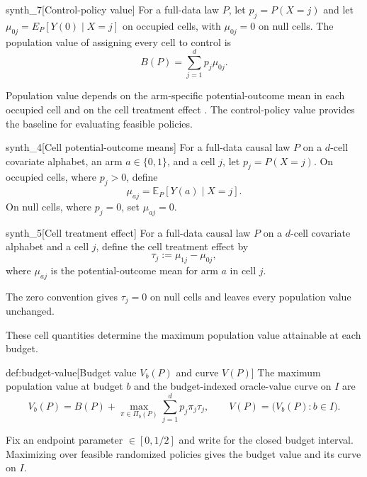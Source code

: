 \begin{definitionv}{synth_7}[Control-policy value]
For a full-data law \(P\), let \(p_j=P(X=j)\) and let \(\mu_{0j}=E_P[Y(0)\mid X=j]\) on occupied cells, with \(\mu_{0j}=0\) on null cells. The population value of assigning every cell to control is
\[
B(P)=\sum_{j=1}^d p_j\mu_{0j}.
\]
\end{definitionv}

Population value depends on the arm-specific potential-outcome mean  in each occupied cell and on the cell treatment effect . The control-policy value  provides the baseline for evaluating feasible policies.

\begin{definitionv}{synth_4}[Cell potential-outcome means]
For a full-data causal law \(P\) on a \(d\)-cell covariate alphabet, an arm \(a\in\{0,1\}\), and a cell \(j\), let \(p_j=P(X=j)\). On occupied cells, where \(p_j>0\), define
\[
\mu_{aj}=\mathbb E_P\!\left[Y(a)\mid X=j\right].
\]
On null cells, where \(p_j=0\), set \(\mu_{aj}=0\).
\end{definitionv}

\begin{definitionv}{synth_5}[Cell treatment effect]
For a full-data causal law \(P\) on a \(d\)-cell covariate alphabet and a cell \(j\), define the cell treatment effect by
\[
\tau_j := \mu_{1j}-\mu_{0j},
\]
where \(\mu_{aj}\) is the potential-outcome mean for arm \(a\) in cell \(j\).
\end{definitionv}

The zero convention gives \(\tau_j=0\) on null cells and leaves every population value unchanged.

These cell quantities determine the maximum population value attainable at each budget.

\begin{definitionv}{def:budget-value}[Budget value $V_b(P)$ and curve $V(P)$]
The maximum population value at budget \(b\) and the budget-indexed oracle-value curve on \(I\) are
\[
V_b(P)=B(P)+\max_{\pi\in\Pi_b(P)}\sum_{j=1}^d p_j\pi_j\tau_j,
\qquad
V(P)=\bigl(V_b(P):b\in I\bigr).
\]
\end{definitionv}

Fix an endpoint parameter \(\in[0,1/2]\) and write  for the closed budget interval. Maximizing over feasible randomized policies gives the budget value  and its curve on \(I\).

